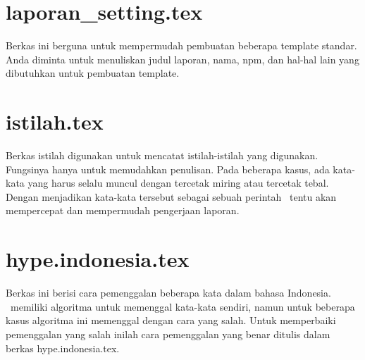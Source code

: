 \section{laporan\_setting.tex}
Berkas ini berguna untuk mempermudah pembuatan beberapa template standar. 
Anda diminta untuk menuliskan judul laporan, nama, npm, dan hal-hal lain yang 
dibutuhkan untuk pembuatan template. 


\section{istilah.tex}
Berkas istilah digunakan untuk mencatat istilah-istilah yang digunakan. 
Fungsinya hanya untuk memudahkan penulisan.
Pada beberapa kasus, ada kata-kata yang harus selalu muncul dengan tercetak 
miring atau tercetak tebal. 
Dengan menjadikan kata-kata tersebut sebagai sebuah perintah \latex~tentu akan 
mempercepat dan mempermudah pengerjaan laporan. 


\section{hype.indonesia.tex}
Berkas ini berisi cara pemenggalan beberapa kata dalam bahasa Indonesia. 
\latex~memiliki algoritma untuk memenggal kata-kata sendiri, namun untuk 
beberapa kasus algoritma ini memenggal dengan cara yang salah. 
Untuk memperbaiki pemenggalan yang salah inilah cara pemenggalan yang benar 
ditulis dalam berkas hype.indonesia.tex.